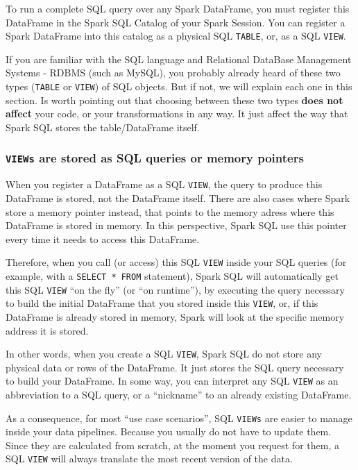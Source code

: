 \documentclass[
  11pt,
  letterpaper,
  DIV=11,
  numbers=noendperiod]{scrreprt}
\begin{document}
To run a complete SQL query over any Spark DataFrame, you must register
this DataFrame in the Spark SQL Catalog of your Spark Session. You can
register a Spark DataFrame into this catalog as a physical SQL
\texttt{TABLE}, or, as a SQL \texttt{VIEW}.

If you are familiar with the SQL language and Relational DataBase
Management Systems - RDBMS (such as MySQL), you probably already heard
of these two types (\texttt{TABLE} or \texttt{VIEW}) of SQL objects. But
if not, we will explain each one in this section. Is worth pointing out
that choosing between these two types \textbf{does not affect} your
code, or your transformations in any way. It just affect the way that
Spark SQL stores the table/DataFrame itself.

\subsubsection{\texorpdfstring{\texttt{VIEWs} are stored as SQL queries
or memory
pointers}{VIEWs are stored as SQL queries or memory pointers}}\label{views-are-stored-as-sql-queries-or-memory-pointers}

When you register a DataFrame as a SQL \texttt{VIEW}, the query to
produce this DataFrame is stored, not the DataFrame itself. There are
also cases where Spark store a memory pointer instead, that points to
the memory adress where this DataFrame is stored in memory. In this
perspective, Spark SQL use this pointer every time it needs to access
this DataFrame.

Therefore, when you call (or access) this SQL \texttt{VIEW} inside your
SQL queries (for example, with a \texttt{SELECT\ *\ FROM} statement),
Spark SQL will automatically get this SQL \texttt{VIEW} ``on the fly''
(or ``on runtime''), by executing the query necessary to build the
initial DataFrame that you stored inside this \texttt{VIEW}, or, if this
DataFrame is already stored in memory, Spark will look at the specific
memory address it is stored.

In other words, when you create a SQL \texttt{VIEW}, Spark SQL do not
store any physical data or rows of the DataFrame. It just stores the SQL
query necessary to build your DataFrame. In some way, you can interpret
any SQL \texttt{VIEW} as an abbreviation to a SQL query, or a
``nickname'' to an already existing DataFrame.

As a consequence, for most ``use case scenarios'', SQL \texttt{VIEWs}
are easier to manage inside your data pipelines. Because you usually do
not have to update them. Since they are calculated from scratch, at the
moment you request for them, a SQL \texttt{VIEW} will always translate
the most recent version of the data.
\end{document}
